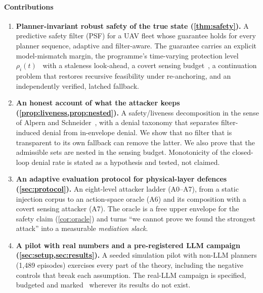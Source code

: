 \paragraph{Contributions}
\begin{enumerate}[label=\textbf{C\arabic*}]
\item \textbf{Planner-invariant robust safety of the true state
  (\cref{thm:safety}).} A predictive safety filter (PSF) for a UAV fleet
  whose guarantee holds for every planner sequence, adaptive and
  filter-aware. The guarantee carries an explicit model-mismatch margin, the
  programme's time-varying protection level $\rho_i(t)$~\cite{paperIII} with
  a staleness look-ahead, a covert sensing budget~\cite{paperIV}, a
  continuation problem that restores recursive feasibility under re-anchoring,
  and an independently verified, latched fallback.
\item \textbf{An honest account of what the attacker keeps
  (\cref{prop:liveness,prop:nested}).} A safety/liveness decomposition in the
  sense of Alpern and Schneider~\cite{alpern1985liveness}, with a denial
  taxonomy that separates filter-induced denial from in-envelope denial. We
  show that no filter that is transparent to its own fallback can remove the
  latter. We also prove that the admissible sets are nested in the sensing
  budget. Monotonicity of the closed-loop denial rate is stated as a
  hypothesis and tested, not claimed.
\item \textbf{An adaptive evaluation protocol for physical-layer defences
  (\cref{sec:protocol}).} An eight-level attacker ladder (A0--A7), from a
  static injection corpus to an action-space oracle (A6) and its composition
  with a covert sensing attacker (A7). The oracle is a free upper envelope for
  the safety claim (\cref{cor:oracle}) and turns ``we cannot prove we found
  the strongest attack'' into a measurable \emph{mediation slack}.
\item \textbf{A pilot with real numbers and a pre-registered LLM campaign
  (\cref{sec:setup,sec:results}).} A seeded simulation pilot with non-LLM
  planners (1,489 episodes) exercises every part of the theory, including the
  negative controls that break each assumption. The real-LLM campaign is
  specified, budgeted and marked \pending\ wherever its results do not exist.
\end{enumerate}

